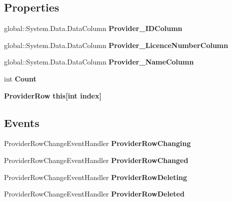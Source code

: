 \subsection*{Properties}
\begin{DoxyCompactItemize}
\item 
\mbox{\label{class_a_f_h___scheduler_1_1_home_inspection_db_data_set_1_1_provider_data_table_ae3c2e1be8146cf703516208ee916e71b}} 
global\+::\+System.\+Data.\+Data\+Column {\bfseries Provider\+\_\+\+I\+D\+Column}\hspace{0.3cm}{\ttfamily  [get]}
\item 
\mbox{\label{class_a_f_h___scheduler_1_1_home_inspection_db_data_set_1_1_provider_data_table_a7d57853361ce924d78cc4c4c7a4d254d}} 
global\+::\+System.\+Data.\+Data\+Column {\bfseries Provider\+\_\+\+Licence\+Number\+Column}\hspace{0.3cm}{\ttfamily  [get]}
\item 
\mbox{\label{class_a_f_h___scheduler_1_1_home_inspection_db_data_set_1_1_provider_data_table_ace59ba653a798e105654dc362b86f3a4}} 
global\+::\+System.\+Data.\+Data\+Column {\bfseries Provider\+\_\+\+Name\+Column}\hspace{0.3cm}{\ttfamily  [get]}
\item 
\mbox{\label{class_a_f_h___scheduler_1_1_home_inspection_db_data_set_1_1_provider_data_table_aced5b2c2560ae97e32e9f0c7d9b6d241}} 
int {\bfseries Count}\hspace{0.3cm}{\ttfamily  [get]}
\item 
\mbox{\label{class_a_f_h___scheduler_1_1_home_inspection_db_data_set_1_1_provider_data_table_a83f24f955cd95ee3fe81983598507836}} 
\textbf{ Provider\+Row} {\bfseries this[int index]}\hspace{0.3cm}{\ttfamily  [get]}
\end{DoxyCompactItemize}
\subsection*{Events}
\begin{DoxyCompactItemize}
\item 
\mbox{\label{class_a_f_h___scheduler_1_1_home_inspection_db_data_set_1_1_provider_data_table_ac060c81bae7be7768e64e38e2ea1dfbc}} 
Provider\+Row\+Change\+Event\+Handler {\bfseries Provider\+Row\+Changing}
\item 
\mbox{\label{class_a_f_h___scheduler_1_1_home_inspection_db_data_set_1_1_provider_data_table_a6555507528a51109a90d61c3aa626b12}} 
Provider\+Row\+Change\+Event\+Handler {\bfseries Provider\+Row\+Changed}
\item 
\mbox{\label{class_a_f_h___scheduler_1_1_home_inspection_db_data_set_1_1_provider_data_table_aaf685603ac5a64dbb0692832d3c79cac}} 
Provider\+Row\+Change\+Event\+Handler {\bfseries Provider\+Row\+Deleting}
\item 
\mbox{\label{class_a_f_h___scheduler_1_1_home_inspection_db_data_set_1_1_provider_data_table_a750e9abcb51aa70f5476a8b7d94509c0}} 
Provider\+Row\+Change\+Event\+Handler {\bfseries Provider\+Row\+Deleted}
\end{DoxyCompactItemize}


